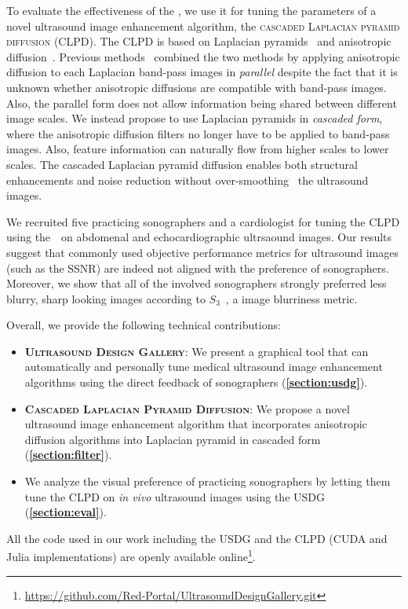 To evaluate the effectiveness of the \usdg, we use it for tuning the parameters of a novel ultrasound image enhancement algorithm, the \textsc{cascaded Laplacian pyramid diffusion} (CLPD).
The CLPD is based on Laplacian pyramids~\cite{burt_laplacian_1983} and anisotropic diffusion~\cite{perona_scalespace_1990, weickert_anisotropic_1998}.
Previous methods~\cite{zhang_multiscale_2006, zhang_nonlinear_2007, kang_new_2016} combined the two methods by applying anisotropic diffusion to each Laplacian band-pass images in \textit{parallel} despite the fact that it is unknown whether anisotropic diffusions are compatible with band-pass images.
Also, the parallel form does not allow information being shared between different image scales.
We instead propose to use Laplacian pyramids in \textit{cascaded form}, where the anisotropic diffusion filters no longer have to be applied to band-pass images.
Also, feature information can naturally flow from higher scales to lower scales.
The cascaded Laplacian pyramid diffusion enables both structural enhancements and noise reduction without over-smoothing~\cite{ramos-llorden_anisotropic_2015, mishra_edge_2018} the ultrasound images.

We recruited five practicing sonographers and a cardiologist for tuning the CLPD using the~\usdg~on abdomenal and echocardiographic ultrsaound images.
Our results suggest that commonly used objective performance metrics for ultrasound images (such as the SSNR) are indeed not aligned with the preference of sonographers.
Moreover, we show that all of the involved sonographers strongly preferred less blurry, sharp looking images according to \(S_3\)~\cite{vu_bf_2012}, a image blurriness metric.

\noindent Overall, we provide the following technical contributions:
\begin{itemize}
  \item[\ding{228}] \textsc{\textbf{Ultrasound Design Gallery}}: We present a graphical tool that can automatically and personally tune medical ultrasound image enhancement algorithms using the direct feedback of sonographers (\textbf{\cref{section:usdg}}).
    \vspace{0.02in}
  \item[\ding{228}] \textsc{\textbf{Cascaded Laplacian Pyramid Diffusion}}:  We propose a novel ultrasound image enhancement algorithm that incorporates anisotropic diffusion algorithms into Laplacian pyramid in cascaded form (\textbf{\cref{section:filter}}).
  \item[\ding{228}] We analyze the visual preference of practicing sonographers by letting them tune the CLPD on \textit{in vivo} ultrasound images using the USDG (\textbf{\cref{section:eval}}).
\end{itemize}
All the code used in our work including the USDG and the CLPD (CUDA and Julia implementations) are openly available online\footnote{\url{https://github.com/Red-Portal/UltrasoundDesignGallery.git}}.


